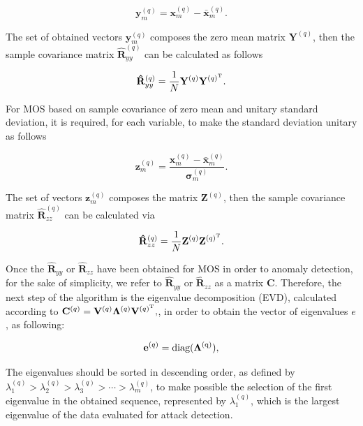 \documentclass[twocolumn]{svjour3}          	%
\begin{document}
\begin{equation}\label{eq:eq03}
\mathbf{y}_{m}^{(q)} = \mathbf{x}_{m}^{(q)} - \bar{\mathbf{x}}_{m}^{(q)}.
\end{equation}

The set of obtained vectors $\mathbf{y}_{m}^{(q)}$ composes the zero mean matrix $\mathbf{Y}^{(q)}$, then the sample covariance matrix $\mathbf{\hat{R}}_{yy}^{(q)}$ can be calculated as follows

\begin{equation}\label{eq:eq04}
\mathbf{\hat{R}}_{yy}^{(q)} = \frac{1}{N}\mathbf{Y}^{(q)}\mathbf{Y}^{(q)^{\rm T}}.
\end{equation}

For MOS based on sample covariance of zero mean and unitary standard deviation, it is required, for each variable, to make the standard deviation unitary as follows

\begin{equation}\label{eq:eq05}
\mathbf{z}_{m}^{(q)} = \frac{\mathbf{x}_{m}^{(q)} - \bar{\mathbf{x}}_{m}^{(q)}}{\mathbf{\sigma}_{m}^{(q)}}.
\end{equation}

The set of vectors $\mathbf{z}_{m}^{(q)}$ composes the matrix $\mathbf{Z}^{(q)}$, then the sample covariance matrix $\mathbf{\hat{R}}_{zz}^{(q)}$ can be calculated via 

\begin{equation}\label{eq:eq06}
\mathbf{\hat{R}}_{zz}^{(q)} = \frac{1}{N}\mathbf{Z}^{(q)}\mathbf{Z}^{(q)^{\rm T}}.
\end{equation}

Once the $\mathbf{\hat{R}}_{yy}$ or $\mathbf{\hat{R}}_{zz}$ have been obtained for MOS in order to anomaly detection, for the sake of simplicity, we refer to $\mathbf{\hat{R}}_{yy}$ or $\mathbf{\hat{R}}_{zz}$ as a matrix $\mathbf{C}$. Therefore, the next step of the algorithm is the eigenvalue decomposition (EVD), calculated according to $\mathbf{C}^{(q)} = \mathbf{V}^{(q)}\mathbf{\Lambda}^{(q)}\mathbf{V}^{(q)^{\rm T}},$, in order to obtain the vector of eigenvalues $e$, as following:

\begin{equation}\label{eq:eq07}
\mathbf{e}^{(q)} = \rm diag(\mathbf{\Lambda}^{(q)}),
\end{equation}

The eigenvalues should be sorted in descending order, as defined by $\lambda_{1}^{(q)} > \lambda_{2}^{(q)} > \lambda_{3}^{(q)} > \cdots > \lambda_{m}^{(q)}$, to make possible the selection of the first eigenvalue in the obtained sequence, represented by $\lambda_{1}^{(q)}$, which is the largest eigenvalue of the data evaluated for attack detection.
\end{document}
